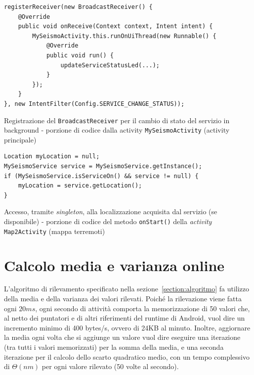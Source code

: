 \documentclass[a4paper,10pt]{memoir}
\begin{document}
\begin{listing}[h]
\begin{verbatim}
registerReceiver(new BroadcastReceiver() {
	@Override
	public void onReceive(Context context, Intent intent) {
		MySeismoActivity.this.runOnUiThread(new Runnable() {
			@Override
			public void run() {
				updateServiceStatusLed(...);
			}
		});
	}
}, new IntentFilter(Config.SERVICE_CHANGE_STATUS));
\end{verbatim}
\caption{Registrazione del \texttt{BroadcastReceiver} per il cambio di stato del servizio in background - porzione di codice dalla activity \texttt{MySeismoActivity} (activity principale)}
\end{listing}


\begin{listing}[h]
\begin{verbatim}
Location myLocation = null;
MySeismoService service = MySeismoService.getInstance();
if (MySeismoService.isServiceOn() && service != null) {
	myLocation = service.getLocation();
}
\end{verbatim}
\caption{Accesso, tramite \textit{singleton}, alla localizzazione acquisita dal servizio (se disponibile) - porzione di codice del metodo \texttt{onStart()} della \textit{activity} \texttt{Map2Activity} (mappa terremoti)}
\end{listing}

\section{Calcolo media e varianza online}

L'algoritmo di rilevamento specificato nella sezione~\ref{section:algoritmo} fa utilizzo della media e della varianza dei valori rilevati. Poiché la rilevazione viene fatta ogni $20ms$, ogni secondo di attività comporta la memorizzazione di 50 valori che, al netto dei puntatori e di altri riferimenti del runtime di Android, vuol dire un incremento minimo di 400 bytes/s, ovvero di 24KB al minuto. Inoltre, aggiornare la media ogni volta che si aggiunge un valore vuol dire eseguire una iterazione (tra tutti i valori memorizzati) per la somma della media, e una seconda iterazione per il calcolo dello scarto quadratico medio, con un tempo complessivo di $\Theta(nm)$ per ogni valore rilevato (50 volte al secondo).
\end{document}
